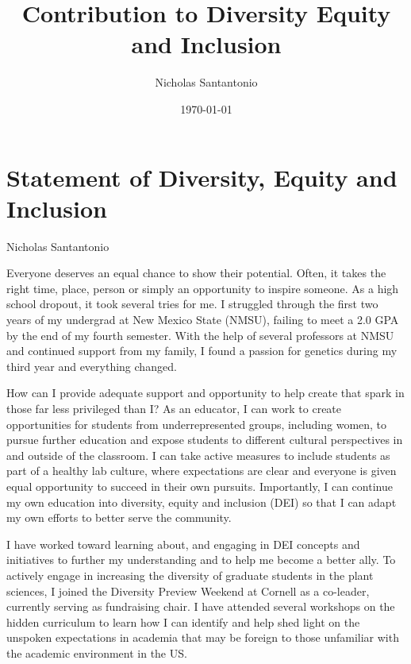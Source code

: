 \documentclass[11pt]{article}
\title{Contribution to Diversity Equity and Inclusion}
\author{Nicholas Santantonio}
\date{\today}
\begin{document}
\section*{\centering Statement of Diversity, Equity and Inclusion}
\begin{center} Nicholas Santantonio \end{center}

\noindent {}

\medskip

\noindent Everyone deserves an equal chance to show their potential. Often, it takes the right time, place, person or simply an opportunity to inspire someone. As a high school dropout, it took several tries for me. I struggled through the first two years of my undergrad at New Mexico State (NMSU), failing to meet a 2.0 GPA by the end of my fourth semester. With the help of several professors at NMSU and continued support from my family, I found a passion for genetics during my third year and everything changed.

How can I provide adequate support and opportunity to help create that spark in those far less privileged than I? As an educator, I can work to create opportunities for students from underrepresented groups, including women, to pursue further education and expose students to different cultural perspectives in and outside of the classroom. I can take active measures to include students as part of a healthy lab culture, where expectations are clear and everyone is given equal opportunity to succeed in their own pursuits. Importantly, I can continue my own education into diversity, equity and inclusion (DEI) so that I can adapt my own efforts to better serve the community. 

I have worked toward learning about, and engaging in DEI concepts and initiatives to further my understanding and to help me become a better ally. To actively engage in increasing the diversity of graduate students in the plant sciences, I joined the Diversity Preview Weekend at Cornell as a co-leader, currently serving as fundraising chair. I have attended several workshops on the hidden curriculum to learn how I can identify and help shed light on the unspoken expectations in academia that may be foreign to those unfamiliar with the academic environment in the US.
\end{document}
